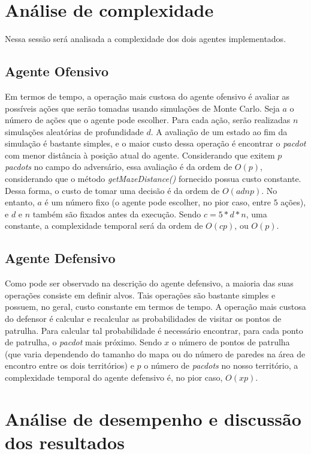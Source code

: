 \documentclass[a4paper,12pt]{article}
\begin{document}
\section{Análise de complexidade}
Nessa sessão será analisada a complexidade dos dois agentes implementados.

\subsection{Agente Ofensivo}
Em termos de tempo, a operação mais custosa do agente ofensivo é avaliar as possíveis ações
que serão tomadas usando simulações de Monte Carlo. Seja $a$ o número de ações
que o agente pode escolher. Para cada ação, serão realizadas $n$ simulações
aleatórias de profundidade $d$. A avaliação de um estado ao fim da simulação
é bastante simples, e o maior custo dessa operação é encontrar o \textit{pacdot}
com menor distância à posição atual do agente. Considerando que exitem $p$
\textit{pacdots} no campo do adversário, essa avaliação é da ordem de $O(p)$,
considerando que o método \textit{getMazeDistance()} fornecido possua custo
constante. Dessa forma, o custo de tomar uma decisão é da ordem de $O(adnp)$.
No entanto, $a$ é um número fixo (o agente pode escolher, no pior caso, entre $5$ ações), e
$d$ e $n$ também são fixados antes da execução. Sendo $c = 5 * d * n$, uma constante,
a complexidade temporal será da ordem de $O(cp)$, ou $O(p)$.


\subsection{Agente Defensivo}
Como pode ser observado na descrição do agente defensivo, a maioria das suas
operações consiste em definir alvos. Tais operações são bastante
simples e possuem, no geral, custo constante em termos de tempo. A operação mais custosa do defensor
é calcular e recalcular as probabilidades de visitar os pontos de patrulha. Para calcular tal
probabilidade é necessário encontrar, para cada ponto de patrulha, o \textit{pacdot} mais próximo.
Sendo $x$ o número de pontos de patrulha (que varia dependendo do tamanho do mapa ou do número
de paredes na área de encontro entre os dois territórios) e $p$ o número de \textit{pacdots}
no nosso território, a complexidade temporal do agente defensivo é, no pior caso, $O(xp)$.

\section{Análise de desempenho e discussão dos resultados}
\end{document}
